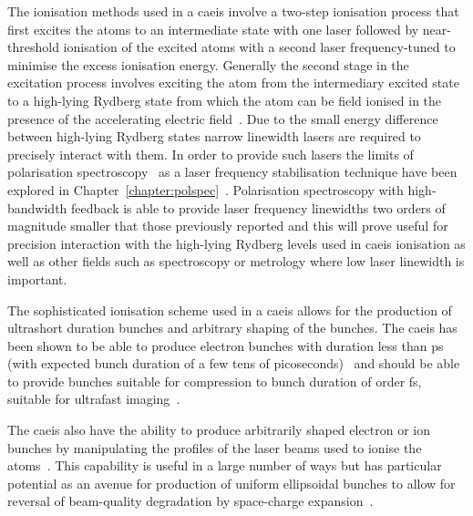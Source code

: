 The ionisation methods used in a \gls{caeis} involve a two-step ionisation process that first excites the atoms to an intermediate state with one laser followed by near-threshold ionisation of the excited atoms with a second laser frequency-tuned to minimise the excess ionisation energy.
Generally the second stage in the excitation process involves exciting the atom from the intermediary excited state to a high-lying Rydberg state from which the atom can be field ionised in the presence of the accelerating electric field~\cite{mcculloch_field_2017}.
Due to the small energy difference between high-lying Rydberg states narrow linewidth lasers are required to precisely interact with them.
In order to provide such lasers the limits of polarisation spectroscopy~\cite{wieman_doppler-free_1976} as a laser frequency stabilisation technique have been explored in Chapter~\ref{chapter:polspec}~\cite{torrance_sub-kilohertz_2016}.
Polarisation spectroscopy with high-bandwidth feedback is able to provide laser frequency linewidths two orders of magnitude smaller that those previously reported and this will prove useful for precision interaction with the high-lying Rydberg levels used in \gls{caeis} ionisation as well as other fields such as spectroscopy or metrology where low laser linewidth is important.

The sophisticated ionisation scheme used in a \gls{caeis} allows for the production of ultrashort duration bunches and arbitrary shaping of the bunches.
The \gls{caeis} has been shown to be able to produce electron bunches with duration less than \unit[130]{ps} (with expected bunch duration of a few tens of picoseconds)~\cite{speirs_identification_2017} and should be able to provide bunches suitable for compression to bunch duration of order \unit[100]{fs}, suitable for ultrafast imaging~\cite{van_oudheusden_compression_2010}.

The \gls{caeis} also have the ability to produce arbitrarily shaped electron or ion bunches by manipulating the profiles of the laser beams used to ionise the atoms~\cite{mcculloch_arbitrarily_2011}.
This capability is useful in a large number of ways but has particular potential as an avenue for production of uniform ellipsoidal bunches to allow for reversal of beam-quality degradation by space-charge expansion~\cite{luiten_how_2004,thompson_bunch_2015}.

